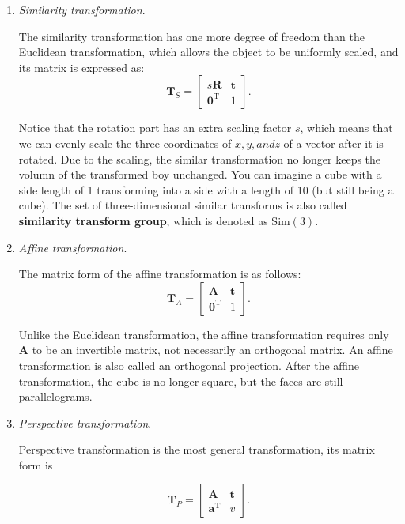 \begin{enumerate}
	\item {\emph{Similarity transformation}}.
	
	The similarity transformation has one more degree of freedom than the Euclidean transformation, which allows the object to be uniformly scaled, and its matrix is ​​expressed as:
	\begin{equation}
	\mathbf{T}_S = \left[ {\begin{array}{*{20}{c}}
		{s \mathbf{R}}& \mathbf{t}\\
		{{ \mathbf{0}^\mathrm{T}}}&1
		\end{array}} \right].
	\end{equation}
	
	Notice that the rotation part has an extra scaling factor $s$, which means that we can evenly scale the three coordinates of $x, y, and z$ of a vector after it is rotated. Due to the scaling, the similar transformation no longer keeps the volumn of ​​the transformed boy unchanged. You can imagine a cube with a side length of 1 transforming into a side with a length of 10 (but still being a cube). The set of three-dimensional similar transforms is also called \textbf{similarity transform group}, which is denoted as $\mathrm{Sim}(3)$.
	
	\item {\emph{Affine transformation}}.
	
	The matrix form of the affine transformation is as follows:
	\begin{equation}
	\mathbf{T}_A = \left[ {\begin{array}{*{20}{c}}
		\mathbf{A} & \mathbf{t}\\
		{{\mathbf{0}^\mathrm{T}}} & 1
		\end{array}} \right].
	\end{equation}
	
	Unlike the Euclidean transformation, the affine transformation requires only $\mathbf{A}$ to be an invertible matrix, not necessarily an orthogonal matrix. An affine transformation is also called an orthogonal projection. After the affine transformation, the cube is no longer square, but the faces are still parallelograms.
	
	\item{ \emph{Perspective transformation}. }
	
	Perspective transformation is the most general transformation, its matrix form is
	
	\begin{equation}
	{\mathbf{T}_P} = \left[ {\begin{array}{*{20}{c}}
		\mathbf{A} & \mathbf{t}\\
		{{\mathbf{a}^\mathrm{T}}} & v
		\end{array}} \right].
	\end{equation}
	

\end{enumerate}

